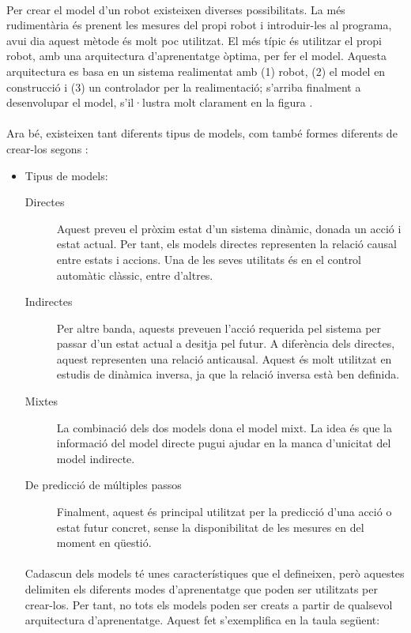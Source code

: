 \documentclass[12pt,a4paper,final,twoside]{article}
\begin{document}
\paragraph{}Per crear el model d'un robot existeixen diverses possibilitats. La més rudimentària és prenent les mesures del propi robot i introduir-les al programa, avui dia aquest mètode és molt poc utilitzat. El més típic és utilitzar el propi robot, amb una arquitectura d'aprenentatge òptima, per fer el model. Aquesta arquitectura es basa en un sistema realimentat amb (1) robot, (2) el model en construcció i (3) un controlador per la realimentació; s'arriba finalment a desenvolupar el model, s'il·lustra molt clarament en la figura .

\paragraph{}Ara bé, existeixen tant diferents tipus de models, com també formes diferents de crear-los segons \cite{Nguyen-Tuong2011}:

\begin{itemize}
\item Tipus de models:

\begin{description}

\item[Directes] Aquest preveu el pròxim estat d'un sistema dinàmic, donada un acció i estat actual. Per tant, els models directes representen la relació causal entre estats i accions. Una de les seves utilitats és en el control automàtic clàssic, entre d'altres.

\item[Indirectes] Per altre banda, aquests preveuen l'acció requerida pel sistema per passar d'un estat actual a desitja pel futur. A diferència dels directes, aquest representen una relació anticausal. Aquest és molt utilitzat en estudis de dinàmica inversa, ja que la relació inversa està ben definida.

\item[Mixtes] La combinació dels dos models dona el model mixt. La idea és que la informació del model directe pugui ajudar en la manca d'unicitat del model indirecte. 

\item[De predicció de múltiples passos] Finalment, aquest és principal utilitzat per la predicció d'una acció o estat futur concret, sense la disponibilitat de les mesures en del moment en qüestió.

\end{description}

\paragraph{}Cadascun dels models té unes característiques que el defineixen, però aquestes delimiten els diferents modes d'aprenentatge que poden ser utilitzats per crear-los. Per tant, no tots els models poden ser creats a partir de qualsevol arquitectura d'aprenentatge. Aquest fet s'exemplifica en la taula següent:

\end{itemize}
\end{document}
